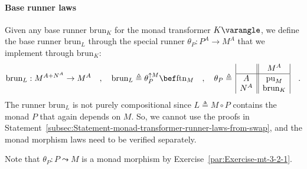 \paragraph{Base runner laws}

Given any base runner $\text{brun}_{K}$ for the monad transformer
$K\varangle$, we define the base runner $\text{brun}_{L}$ through
the special runner $\theta_{P}:P^{A}\rightarrow M^{A}$ that we implement
through $\text{brun}_{K}$:
\begin{equation}
\text{brun}_{L}:M^{A+N^{A}}\rightarrow M^{A}\quad,\quad\text{brun}_{L}\triangleq\theta_{P}^{\uparrow M}\bef\text{ftn}_{M}\quad,\quad\theta_{P}\triangleq\,\begin{array}{|c||c|}
 & M^{A}\\
\hline A & \text{pu}_{M}\\
N^{A} & \text{brun}_{K}
\end{array}\quad.\label{eq:def-of-brun-and-theta-for-free-pointed}
\end{equation}
The runner $\text{brun}_{L}$ is not purely compositional since $L\triangleq M\circ P$
contains the monad $P$ that again depends on $M$. So, we cannot
use the proofs in Statement~\ref{subsec:Statement-monad-transformer-runner-laws-from-swap},
and the monad morphism laws need to be verified separately.

Note that $\theta_{P}:P\leadsto M$ is a monad morphism by Exercise~\ref{par:Exercise-mt-3-2-1}.

